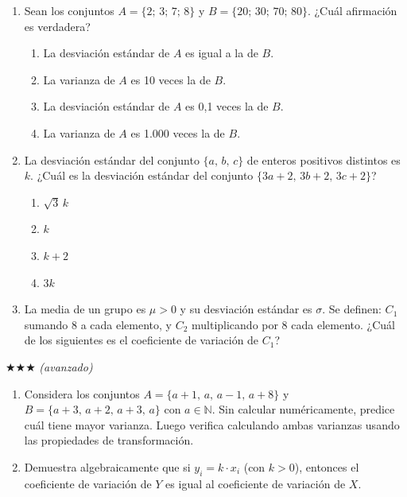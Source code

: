\documentclass[11pt, letterpaper]{article}
\begin{document}
\begin{enumerate}[label=\textbf{\arabic*.}, leftmargin=*, resume]
  \item Sean los conjuntos $A = \{2;\, 3;\, 7;\, 8\}$ y $B = \{20;\, 30;\, 70;\, 80\}$. ¿Cuál afirmación es verdadera?
  \begin{enumerate}[label=\Alph*),leftmargin=14pt]
    \item La desviación estándar de $A$ es igual a la de $B$.
    \item La varianza de $A$ es 10 veces la de $B$.
    \item La desviación estándar de $A$ es 0{,}1 veces la de $B$.
    \item La varianza de $A$ es 1.000 veces la de $B$.
  \end{enumerate}

  \item La desviación estándar del conjunto $\{a,\, b,\, c\}$ de enteros positivos distintos es $k$. ¿Cuál es la desviación estándar del conjunto $\{3a+2,\, 3b+2,\, 3c+2\}$?
  \begin{enumerate}[label=\Alph*),leftmargin=14pt]
    \item $\sqrt{3}\,k$
    \item $k$
    \item $k+2$
    \item $3k$
  \end{enumerate}

  \item La media de un grupo es $\mu > 0$ y su desviación estándar es $\sigma$. Se definen: $C_1$ sumando 8 a cada elemento, y $C_2$ multiplicando por 8 cada elemento. ¿Cuál de los siguientes es el coeficiente de variación de $C_1$?
\end{enumerate}

$\bigstar\bigstar\bigstar$ \textit{(avanzado)}

\begin{enumerate}[label=\textbf{\arabic*.}, leftmargin=*, resume]
  \item Considera los conjuntos $A = \{a+1,\, a,\, a-1,\, a+8\}$ y $B = \{a+3,\, a+2,\, a+3,\, a\}$ con $a \in \mathbb{N}$. Sin calcular numéricamente, predice cuál tiene mayor varianza. Luego verifica calculando ambas varianzas usando las propiedades de transformación.
  \vspace{3.5cm}

  \item Demuestra algebraicamente que si $y_i = k \cdot x_i$ (con $k > 0$), entonces el coeficiente de variación de $Y$ es igual al coeficiente de variación de $X$.
  \vspace{3cm}
\end{enumerate}
\end{document}
